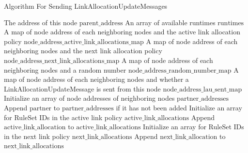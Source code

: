 \begin{algorithm}[H]
  \begin{minipage}{0.8\linewidth}
  \caption{Algorithm For Sending LinkAllocationUpdateMessages}
  \begin{algorithmic}[1]
\Require The address of this node $\text{parent\_address}$
  \Require An array of available runtimes $\text{runtimes}$
  \Require A map of node address of each neighboring nodes and the active link allocation policy $\text{node\_address\_active\_link\_allocations\_map}$
  \Require A map of node address of each neighboring nodes and the next link allocation policy $\text{node\_address\_next\_link\_allocations\_map}$
  \Require A map of node address of each neighboring nodes and a random number $\text{node\_address\_random\_number\_map}$
  \Require A map of node address of each neighboring nodes and whether a LinkAllocationUpdateMessage is sent from this node $\text{node\_address\_lau\_sent\_map}$
    \State Initialize an array of node addresses of neighboring nodes $\text{partner\_addresses}$
      \State Append $\text{partner}$ to $\text{partner\_addresses}$ if it has not been added
      \EndFor
    \EndFor
      \State Initialize an array for RuleSet IDs in the active link policy $\text{active\_link\_allocations}$
            \State Append $\text{active\_link\_allocation}$ to $\text{active\_link\_allocations}$
          \EndFor
        \EndIf
      \State Initialize an array for RuleSet IDs in the next link policy $\text{next\_link\_allocations}$
            \State Append $\text{next\_link\_allocation}$ to $\text{next\_link\_allocations}$
          \EndFor
        \EndIf
        \EndFor
        \EndFor
      \EndFor
    \end{algorithmic}
  \end{minipage}
  \end{algorithm}

